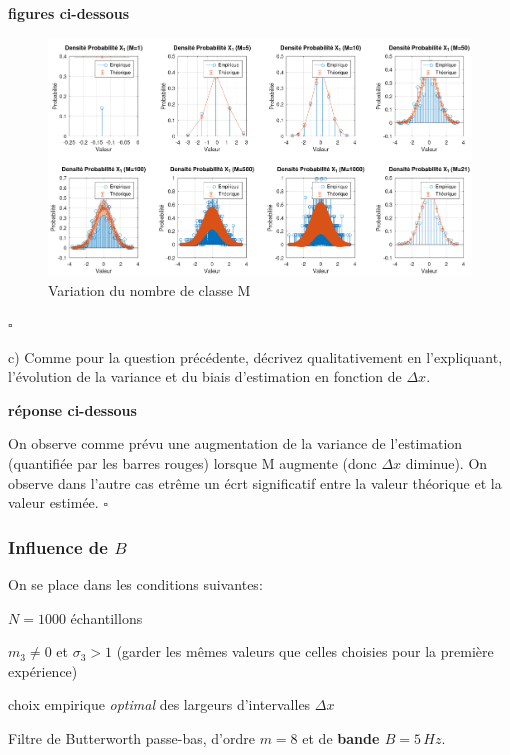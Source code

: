 \documentclass{article}
\newcommand{\debutrep}[1]{\color{blue}\begin{center} \hrulefill \textbf{ #1 } \hrulefill \end{center} }
\newcommand{\finrep}{\vspace*{5mm}\hfill $\square$\color{black}\vspace*{5mm}}
\begin{document}
\begin{list}{}{\setlength{\leftmargin}{6mm} \setlength{\labelwidth}{20mm} \setlength{\labelsep}{2mm} \setlength{\itemsep}{1mm} }
\debutrep{figures ci-dessous}
\begin{figure} [H]
    \centering
    \includegraphics[width=1.15\columnwidth]{Mvar.png}
    \caption{Variation du nombre de classe M}
\end{figure}
\finrep


\item[c)] Comme pour la question précédente, décrivez qualitativement  en l'expliquant, l'évolution de la variance et du biais d'estimation en fonction de $\Delta x$. 

\debutrep{réponse ci-dessous}
On observe comme prévu une augmentation de la variance de l'estimation (quantifiée par les barres rouges) lorsque M augmente (donc $\Delta x$ diminue). On observe dans l'autre cas etrême un écrt significatif entre la valeur théorique et la valeur estimée.
\finrep

\end{list}

\subsubsection{Influence de $B$}

On se place dans les conditions suivantes:

\begin{list}{-}{\setlength{\leftmargin}{3mm} \setlength{\labelwidth}{20mm} \setlength{\labelsep}{2mm} \setlength{\itemsep}{1mm} }
\item $N=1000$ échantillons
\item $m_3 \neq 0$ et $\sigma_3>1$ (garder les mêmes valeurs que celles choisies pour la première expérience)
\item choix empirique {\em optimal} des largeurs d'intervalles $\Delta x$
\item Filtre de Butterworth passe-bas, d'ordre $m=8$ et de \textbf{bande $B=5\,Hz$}.
\end{list}
\end{document}

